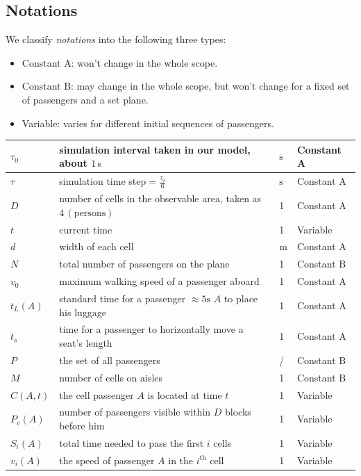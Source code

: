 \documentclass{article}
\newcommand{\cA}{\color{allanblue}Constant A\color{black}}
\newcommand{\cB}{\color{allandarkblue}Constant B\color{black}}
\newcommand{\varr}{\color{allanpurple}Variable\color{black}}
\theoremstyle{definition}
\theoremstyle{remark}
\numberwithin{equation}{section}
\begin{document}
	\subsection{Notations}
	We classify \textit{notations} into the following three types:
	\begin{itemize}
		\item \cA: won't change in the whole scope.
		\item \cB: may change in the whole scope, but won't change for a fixed set of passengers and a set plane.
		\item \varr: varies for different initial sequences of passengers.
	\end{itemize}
	\begin{center}
	\begin{tabular}{|l|l|l|l|}
		\hline
		$\tau_0$&simulation interval taken in our model, about \(1 \,\mathrm{s}\)&$\mathrm{s}$&\cA\\
		\hline
		\(\tau\)&simulation time step\(=\frac{\tau_0}{6}\)&\(\mathrm{s}\)&\cA\\
		\hline
		\(D\)&number of cells in the observable area, taken as \(4\,\left(\mathrm{persons}\right)\)&1&\cA\\
		\hline
		\(t\)&current time&1&\varr\\
		\hline
		$d$&width of each cell&$\mathrm{m}$&\cA\\
		\hline
		$N$&total number of passengers on the plane&1&\cB\\
		\hline
		$v_0$&maximum walking speed of a passenger aboard&1&\cA\\
		\hline
		$t_L (A)$&standard time for a passenger \(\approx 5\mathrm{s}\) $A$ to place his luggage&1&\cA\\
		\hline
		$t_s$&time for a passenger to horizontally move a seat's length&1&\cA\\
		\hline
		$P$&the set of all passengers&/&\cB\\
		\hline
		$M$&number of cells on aisles&1&\cB\\
		\hline
		$C\left( A,t \right)$&the cell passenger $A$ is located at time $t$&1&\varr\\
		\hline
		$P_v\left( A \right)$&number of passengers visible within $D$ blocks before him&1&\varr\\
		\hline
		$S_i\left( A \right)$&total time needed to pass the first $i$ cells& 1&\varr\\
		\hline
		$v_i\left( A \right)$&the speed of passenger $A$ in the \(i^{\mathrm{th}}\) cell&1&\varr\\

\end{tabular}
\end{center}
\end{document}
